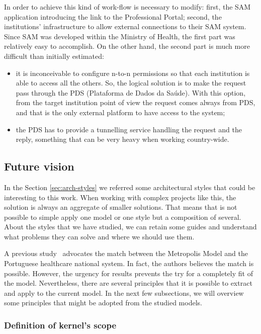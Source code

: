 In order to achieve this kind of work-flow is necessary to modify: first, the SAM application introducing the link to the Professional Portal; second, the institutions' infrastructure to allow external connections to their SAM system. Since SAM was developed within the Ministry of Health, the first part was relatively easy to accomplish. On the other hand, the second part is much more difficult than initially estimated:
\begin{itemize}
\item it is inconceivable to configure n-to-n permissions so that each institution is able to access all the others. So, the logical solution is to make the request pass through the PDS (Plataforma de Dados da Saúde). With this option, from the target institution point of view the request comes always from PDS, and that is the only external platform to have access to the system;
\item the PDS has to provide a tunnelling service handling the request and the reply, something that can be very heavy when working country-wide.
\end{itemize}



\subsection{Future vision}

In the Section \ref{sec:arch-styles} we referred some architectural styles that could be interesting to this work. When working with complex projects like this, the solution is always an aggregate of smaller solutions. That means that is not possible to simple apply one model or one style but a composition of several. About the styles that we have studied, we can retain some guides and understand what problems they can solve and where we should use them.

A previous study~\citep{Carvalho2011a} advocates the match between the Metropolis Model and the Portuguese healthcare national system. In fact, the authors believes the match is possible. However, the urgency for results prevents the try for a completely fit of the model. Nevertheless, there are several principles that it is possible to extract and apply to the current model. In the next few subsections, we will overview some principles that might be adopted from the studied models.


\subsubsection{Definition of kernel's scope}


